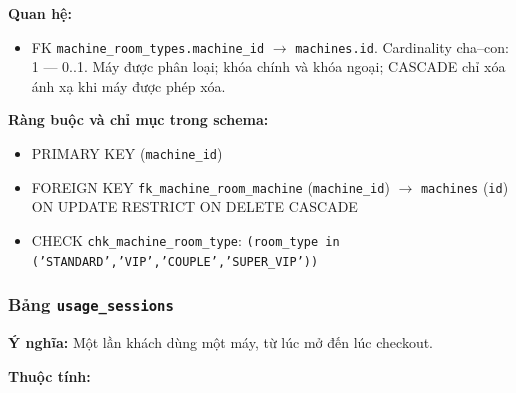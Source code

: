 \textbf{Quan hệ:}

\begin{itemize}

\item FK \texttt{machine\_room\_types.machine\_id} $\rightarrow$ \texttt{machines.id}. Cardinality cha--con: 1 — 0..1. Máy được phân loại; khóa chính và khóa ngoại; CASCADE chỉ xóa ánh xạ khi máy được phép xóa.

\end{itemize}

\textbf{Ràng buộc và chỉ mục trong schema:}

\begin{itemize}

\item PRIMARY KEY (\texttt{machine\_id})

\item FOREIGN KEY \texttt{fk\_machine\_room\_machine} (\texttt{machine\_id}) $\rightarrow$ \texttt{machines} (\texttt{id}) ON UPDATE RESTRICT ON DELETE CASCADE

\item CHECK \texttt{chk\_machine\_room\_type}: \texttt{(room\_type in ('STANDARD','VIP','COUPLE','SUPER\_VIP'))}

\end{itemize}

\subsubsection{Bảng \texttt{usage\_sessions}}

\textbf{Ý nghĩa:} Một lần khách dùng một máy, từ lúc mở đến lúc checkout.\par

\textbf{Thuộc tính:}

